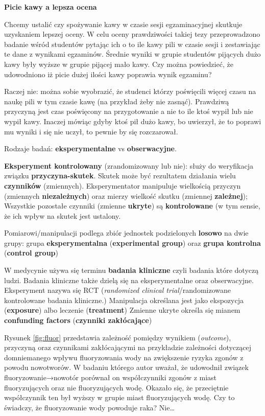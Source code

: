 \documentclass[
  openany]{book}
\begin{document}
\begin{example}
\textbf{Picie kawy a lepsza ocena}

Chcemy ustalić czy spożywanie kawy w czasie sesji egzaminacyjnej
skutkuje uzyskaniem lepszej oceny. W celu oceny prawdziwości takiej
tezy przeprowadzono badanie wśród studentów pytając ich o to ile
kawy pili w czasie sesji i zestawiając te dane z wynikami egzaminów.
Średnie wyniki w
grupie studentów pijących dużo kawy były wyższe w grupie pijącej mało kawy.
Czy można powiedzieć, że udowodniono iż picie
dużej ilości kawy poprawia wynik egzaminu?

Raczej nie: można sobie wyobrazić, że studenci którzy poświęcili
więcej czasu na naukę pili w tym czasie kawę (na przykład żeby nie zasnąć).
Prawdziwą przyczyną jest czas poświęcony na przygotowanie a nie to ile ktoś
wypił lub nie wypił kawy. Inaczej mówiąc gdyby ktoś pił dużo kawy,
bo uwierzył, że to poprawi mu wyniki
i się nie uczył, to pewnie by się rozczarował.
\end{example}

Rodzaje badań: \textbf{eksperymentalne} vs \textbf{obserwacyjne}.

\textbf{Eksperyment kontrolowany} (zrandomizowany lub nie):
służy do weryfikacja związku \textbf{przyczyna-skutek}.
Skutek może być rezultatem działania wielu \textbf{czynników} (zmiennych).
Eksperymentator manipuluje wielkością przyczyn
(zmiennych \textbf{niezależnych}) oraz mierzy wielkość skutku (zmiennej \textbf{zależnej});
Wszystkie pozostałe czynniki (zmienne \textbf{ukryte}) są \textbf{kontrolowane} (w tym
sensie, że ich wpływ na skutek jest ustalony.

Pomiarowi/manipulacji podlega zbiór jednostek podzielonych
\textbf{losowo} na dwie grupy: grupa \textbf{eksperymentalna} (\textbf{experimental group})
oraz \textbf{grupa kontrolna} (\textbf{control group})

W medycynie używa się terminu \textbf{badania kliniczne} czyli badania
które dotyczą ludzi. Badania kliniczne także dzielą
się na eksperymentalne oraz obserwacyjne. Eksperyment nazywa się
RCT (\emph{randomized clinical trial}/randomizowane kontrolowane badania kliniczne.)
Manipulacja określana jest jako
ekspozycja (\textbf{exposure}) albo leczenie (\textbf{treatment})
Zmienne ukryte określa się mianem \textbf{confunding factors} (\textbf{czynniki zakłócające})

Rysunek \ref{fig:fluor} przedstawia zależność pomiędzy wynikiem (\emph{outcome}), przyczyną
oraz czynnikami zakłócającymi na przykładzie zależności dotyczącej domniemanego
wpływu fluoryzowania wody na zwiększenie ryzyka zgonów z powodu nowotworów.
W badaniu którego autor uważał, że udowodnił związek fluoryzowanie→nowotór
porównał on współczynniki zgonów z miast fluoryzujących oraz
nie fluoryzujących wodę. Okazało się, że przeciętnie współczynnik ten był wyższy
w grupie miast fluoryzujących wodę. Czy to świadczy, że fluoryzowanie wody
powoduje raka? Nie\ldots{}
\end{document}
